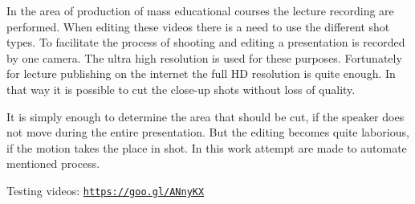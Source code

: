 In the area of production of mass educational courses the lecture recording are performed. When editing these videos there is a need to use the different shot types. To facilitate the process of shooting and editing a presentation is recorded by one camera. The ultra high resolution is used for these purposes. Fortunately for lecture publishing on the internet the full H\-D resolution is quite enough. In that way it is possible to cut the close-\/up shots without loss of quality.





It is simply enough to determine the area that should be cut, if the speaker does not move during the entire presentation. But the editing becomes quite laborious, if the motion takes the place in shot. In this work attempt are made to automate mentioned process.

Testing videos\-: \href{https://goo.gl/ANnyKX}{\tt https\-://goo.\-gl/\-A\-Nny\-K\-X} 